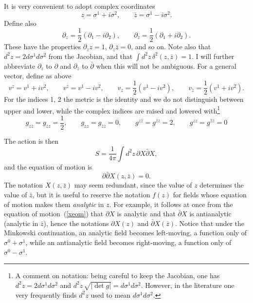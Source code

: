 It is very convenient to adopt complex coordinates
\begin{equation}
z = \sigma^1 + i \sigma^2, \qquad \bar z = \sigma^1 - i \sigma^2.
\end{equation}
Define also
\begin{equation}
\partial_z = \frac{1}{2} (\partial_1 - i \partial_2),
\qquad  \partial_{\bar z} =
\frac{1}{2} (\partial_1 + i \partial_2). \label{comdir}
\end{equation}
These have the properties $\partial_z z = 1$, $\partial_z \bar z =
0$, and so on.  Note also that $d^2 z = 2 d\sigma^1 d\sigma^2$
from the Jacobian, and that $\int d^2 z \, \delta^2(z,\bar z) = 1$.
I will further abbreviate $\partial_z$ to $\partial$
and $\partial_{\bar z}$ to $\bar\partial$ when this will not be
ambiguous.  For a general vector, define as above
\begin{equation}
v^z = v^1 + i v^2, \qquad v^{\bar z} = v^1 - i v^2, \qquad v_z = 
\frac{1}{2}(v^1 - i v^2), \qquad
v_{\bar z} = \frac{1}{2}(v^1 + i v^2).
\end{equation}
For the indices 1, 2 the metric is the identity and we do not
distinguish between upper and lower, while the complex indices are
raised and lowered with\footnote
{A comment on notation: being careful to keep the Jacobian, one
has $d^2 z = 2 d\sigma^1 d\sigma^2$ and $d^2z \, \sqrt{|\det g|}
= d\sigma^1 d\sigma^2$.  However, in the literature one very
frequently finds $d^2 z$ used to mean $d\sigma^1 d\sigma^2$.}
\begin{equation}
g_{z\bar z} = g_{\bar z z} = \frac{1}{2}, \qquad g_{zz} = g_{\bar z
\bar z} = 0, \qquad g^{z\bar z} = g^{\bar z z} = 2, \qquad
g^{zz} = g^{\bar z \bar z} = 0
\end{equation}

The action is then
\begin{equation}
S= \frac{1}{4\pi} \int d^2z\,
\partial X \bar\partial X, \label{xact2}
\end{equation}
and the equation of motion is
\begin{equation}
\partial \bar\partial X(z,\bar z) = 0. \label{xeom}
\end{equation}
The notation $X(z,\bar z)$ may seem redundant, since the
value of $z$ determines the value of $\bar z$, but it is useful to
reserve the notation $f(z)$ for fields whose equation of motion
makes them {\it analytic} in $z$.  For example, it follows at once
from the equation of motion~(\ref{xeom}) that $\partial X$
is analytic and that $\bar\partial X$ is antianalytic (analytic in
$\bar z$), hence the notations $\partial X(z)$ and $\bar\partial
X(\bar z)$.  Notice that under the Minkowski continuation, an
analytic field becomes left-moving, a function only of $\sigma^0
+ \sigma^1$, while an antianalytic field becomes right-moving,
a function only of $\sigma^0 - \sigma^1$.

